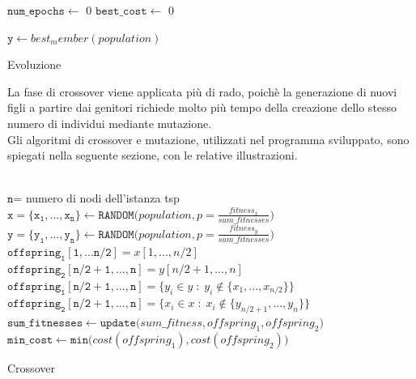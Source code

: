 \begin{algorithm}[H]
\DontPrintSemicolon
{}
\BlankLine
 $\mathtt{num\_epochs} \gets$ 0\;
 $\mathtt{best\_cost} \gets$ 0\;
 \BlankLine
 
 $\mathtt{y}\gets best_member(population)$
 \caption{Evoluzione}
\end{algorithm}
La fase di crossover viene applicata più di rado, poichè la generazione di nuovi figli a partire dai genitori richiede molto più tempo della creazione dello stesso numero di individui mediante mutazione.\\
Gli algoritmi di crossover e mutazione, utilizzati nel programma sviluppato, sono spiegati nella seguente sezione, con le relative illustrazioni.\\\\
\begin{algorithm}[H]
\DontPrintSemicolon
{}
\BlankLine 
$\mathtt{n}$= numero di nodi dell'istanza tsp\;
$\mathtt{x=\{x_1,...,x_n\} \gets RANDOM(}population, p=\frac{fitness_x}{sum\_fitnesses})$\;
$\mathtt{y=\{y_1,...,y_n\} \gets RANDOM(}population, p=\frac{fitness_y}{sum\_fitnesses})$\;
 \BlankLine \BlankLine
 $\mathtt{offspring_1[1,...n/2]}=x[1,..., n/2]$\;
 $\mathtt{offspring_2[n/2+1,...,n]}=y[n/2+1,..., n]$\;
 $\mathtt{offspring_1[n/2+1,...,n]}=\{y_i\in y\; :\; y_i\not\in\{x_1, ..., x_{n/2}\}\}$\;
 $\mathtt{offspring_2[n/2+1,...,n]}=\{x_i\in x\; :\; x_i\not\in\{y_{n/2+1}, ..., y_{n}\}\}$\;
  \BlankLine
  $\mathtt{sum\_fitnesses\gets update(}sum\_fitness, offspring_1, offspring_2\mathtt{)}$\;
  \BlankLine  
  $\mathtt{min\_cost \gets min(}cost(offspring_1), cost(offspring_2)\mathtt{)}$\;  
  \BlankLine
\caption{Crossover}
\end{algorithm}

